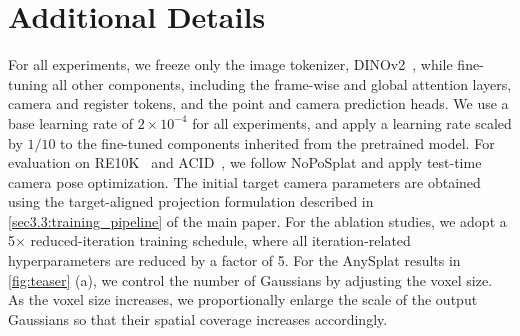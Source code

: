 \section{Additional Details}
For all experiments, we freeze only the image tokenizer, DINOv2~\cite{oquab2023dinov2}, while fine-tuning all other components, including the frame-wise and global attention layers, camera and register tokens, and the point and camera prediction heads. We use a base learning rate of $2\!\times\!10^{-4}$ for all experiments, and apply a learning rate scaled by $1/10$ to the fine-tuned components inherited from the pretrained model. For evaluation on RE10K~\cite{zhou2018re10k} and ACID~\cite{liu2021acid}, we follow NoPoSplat and apply test-time camera pose optimization. The initial target camera parameters are obtained using the target-aligned projection formulation described in \cref{sec3.3:training_pipeline} of the main paper. For the ablation studies, we adopt a 5$\times$ reduced-iteration training schedule, where all iteration-related hyperparameters are reduced by a factor of 5. For the AnySplat results in \cref{fig:teaser} (a), we control the number of Gaussians by adjusting the voxel size. As the voxel size increases, we proportionally enlarge the scale of the output Gaussians so that their spatial coverage increases accordingly. 
